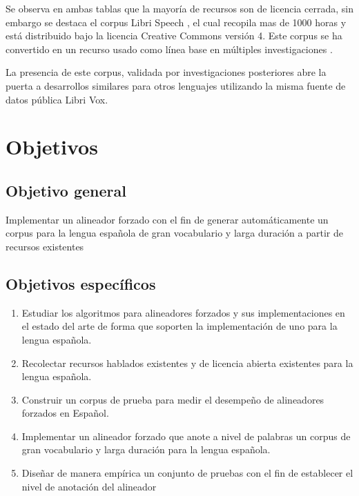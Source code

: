 

Se observa en ambas tablas que la mayoría de recursos son de licencia cerrada, sin embargo se destaca el corpus Libri Speech \cite{LIBRISPEECH}, el cual recopila mas de 1000 horas y está distribuido bajo la licencia Creative Commons versión 4. Este corpus se ha convertido en un recurso usado como línea base en múltiples investigaciones \cite{libribox_benchmark1,librilight,libribox_benchmark3}. 

La presencia de este corpus, validada por investigaciones posteriores abre la puerta a desarrollos similares para otros lenguajes utilizando la misma fuente de datos pública Libri Vox. 



\section{Objetivos}


\subsection{Objetivo general}

Implementar un alineador forzado con el fin de generar automáticamente un corpus para la lengua española de gran vocabulario y larga duración a partir de recursos existentes

\subsection{Objetivos específicos}

\begin{enumerate}
    \item Estudiar los algoritmos para alineadores forzados y sus implementaciones en el estado del arte de forma que soporten la implementación de uno para la lengua española.
    \item Recolectar recursos hablados existentes y de licencia abierta existentes para la lengua española.
    \item Construir un corpus de prueba para medir el desempeño de alineadores forzados en Español.
    \item Implementar un alineador forzado que anote a nivel de palabras un corpus de gran vocabulario y larga duración para la lengua española.
    \item Diseñar de manera empírica un conjunto de pruebas con el fin de establecer el nivel de anotación del alineador

\end{enumerate}

